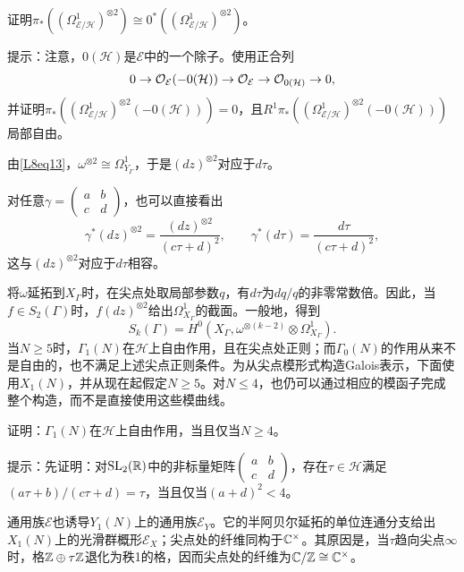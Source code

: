 \begin{exercise*}\label{L8S1EX2}
证明$\pi_*((\Omega^1_{\mathcal E/\mathcal H})^{\otimes2})\cong0^*((\Omega^1_{\mathcal E/\mathcal H})^{\otimes2})$。

提示：注意，$0(\mathcal H)$是$\mathcal E$中的一个除子。使用正合列
\[0\to\mathcal O_{\mathcal E}(-0(\mathcal H))\to\mathcal O_{\mathcal E}\to\mathcal O_{0(\mathcal H)}\to0,\]
并证明$\pi_*((\Omega^1_{\mathcal E/\mathcal H})^{\otimes2}(-0(\mathcal H)))=0$，且$R^1\pi_*((\Omega^1_{\mathcal E/\mathcal H})^{\otimes2}(-0(\mathcal H)))$局部自由。
\end{exercise*}
由\eqref{L8eq13}，$\omega^{\otimes2}\cong\Omega^1_{Y_\Gamma}$，于是$(dz)^{\otimes2}$对应于$d\tau$。
\begin{note}[L8S1O2]
对任意$\gamma=\begin{pmatrix}a&b\\c&d\end{pmatrix}$，也可以直接看出
\[\gamma^*(dz)^{\otimes2}=\frac{(dz)^{\otimes2}}{(c\tau+d)^2},\qquad \gamma^*(d\tau)=\frac{d\tau}{(c\tau+d)^2},\]
这与$(dz)^{\otimes2}$对应于$d\tau$相容。
\end{note}
将$\omega$延拓到$X_\Gamma$时，在尖点处取局部参数$q$，有$d\tau$为$dq/q$的非零常数倍。因此，当$f\in S_2(\Gamma)$时，$f(dz)^{\otimes2}$给出$\Omega^1_{X_\Gamma}$的截面。一般地，得到
\[S_k(\Gamma)=H^0(X_\Gamma,\omega^{\otimes(k-2)}\otimes\Omega^1_{X_\Gamma}).\]
当$N\geq5$时，$\Gamma_1(N)$在$\mathcal H$上自由作用，且在尖点处正则；而$\Gamma_0(N)$的作用从来不是自由的，也不满足上述尖点正则条件。为从尖点模形式构造Galois表示，下面使用$X_1(N)$，并从现在起假定$N\geq5$。对$N\leq4$，也仍可以通过相应的模函子完成整个构造，而不是直接使用这些模曲线。
\begin{exercise*}\label{L8S1EX3}
证明：$\Gamma_1(N)$在$\mathcal H$上自由作用，当且仅当$N\geq4$。

提示：先证明：对$\operatorname{SL}_2(\mathbb{R})$中的非标量矩阵$\begin{pmatrix}a&b\\c&d\end{pmatrix}$，存在$\tau\in\mathcal H$满足$(a\tau+b)/(c\tau+d)=\tau$，当且仅当$(a+d)^2<4$。
\end{exercise*}
通用族$\mathcal E$也诱导$Y_1(N)$上的通用族$\mathcal E_Y$。它的半阿贝尔延拓的单位连通分支给出$X_1(N)$上的光滑群概形$\mathcal E_X$；尖点处的纤维同构于$\mathbb{C}^\times$。其原因是，当$\tau$趋向尖点$\infty$时，格$\mathbb{Z}\oplus\tau\mathbb{Z}$退化为秩1的格，因而尖点处的纤维为$\mathbb{C}/\mathbb{Z}\cong\mathbb{C}^\times$。
